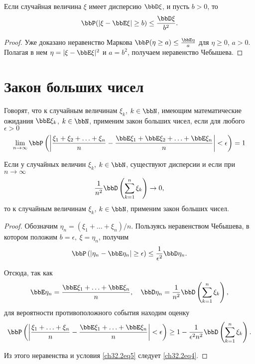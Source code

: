 \begin{thm}
Если случайная величина $\xi$ имеет дисперсию $\bbD \xi$, и пусть $b>0$, то
$$
\bbP(|\xi-\bbE \xi|\ge b ) \le\frac{\bbD \xi}{b^2}.
$$
\end{thm} 
\begin{proof}
Уже доказано неравенство Маркова $\bbP(\eta \ge a) \le \frac{\bbE\eta}{a}$  для $\eta \ge 0$, $a>0$. Полагая в нем $\eta = |\xi-\bbE \xi|^2$ и $a=b^2$, получаем неравенство Чебышева.
\end{proof}

\section{Закон больших чисел}

Говорят, что к случайным величинам $\xi_k$, $k \in \bbN$, имеющим математические ожидания $\bbE\xi_k$,  $k \in \bbN$, применим закон больших чисел, если для любого $\epsilon > 0$
\begin{equation} \label{ch32.2eq4}
\lim_{n \to \infty} \bbP \left( \left| \frac{\xi_1 + \xi_2 + \ldots + \xi_n}{n} - \frac{\bbE \xi_1 + \bbE \xi_2 + \ldots + \bbE \xi_n}{n} \right| < \epsilon \right) = 1
\end{equation}

\begin{thm} [Маркова]
Если у случайных величин $\xi_k$, $k \in \bbN$, существуют дисперсии и если при $n \to \infty$
\begin{equation} \label{ch32.2eq5}
\frac{1}{n^2} \bbD  \left( \sum_{k  = 1}^{n} \xi_k\right) \to 0,
\end{equation}
то к случайным величинам $\xi_k$, $k \in \bbN$, применим закон больших чисел.
\end{thm}

\begin{proof}
Обозначим $\eta_n = (\xi_1 + \ldots + \xi_n) / n$. Пользуясь неравенством Чебышева, в котором положим $b = \epsilon, \: \xi = \eta_n$, получим
$$
\bbP \left( \left| \eta_n - \bbE  \eta_n \right| \ge \epsilon \right) \le \frac{1}{\epsilon^2} \bbD  \eta_n.
$$

Отсюда, так как
$$
\bbE  \eta_n = \frac{\bbE \xi_1 + \ldots + \bbE \xi_n}{n}, \quad \bbD \eta_n = \frac{1}{n^2} \bbD  \left( \sum_{k  = 1}^{n} \xi_k\right),
$$ 
для вероятности противоположного события находим оценку
$$
\bbP \left( \left| \frac{\xi_1 + \ldots + \xi_n}{n} - \frac{\bbE \xi_1 + \ldots + \bbE \xi_n}{n} \right| < \epsilon \right) \ge 1 - \frac{1}{\epsilon^2n^2} \bbD  \left( \sum_{k  = 1}^{n} \xi_k\right).
$$

Из этого неравенства и условия \eqref{ch32.2eq5} следует \eqref{ch32.2eq4}.
\end{proof}

